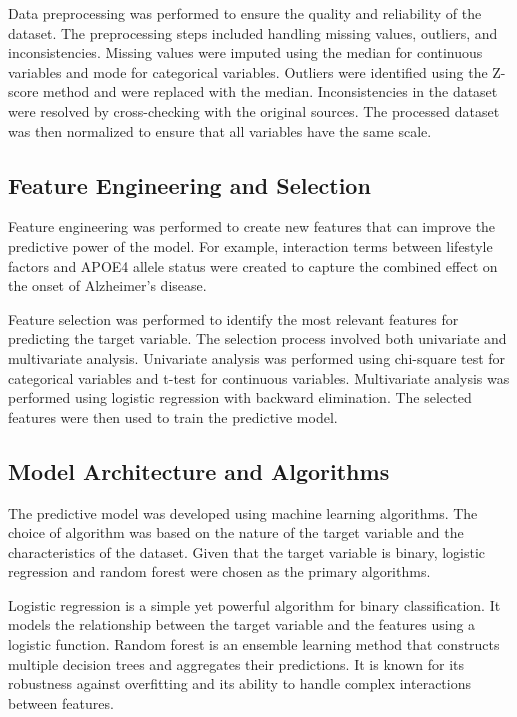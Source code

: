 \documentclass[conference]{IEEEtran}
\begin{document}
Data preprocessing was performed to ensure the quality and reliability of the dataset. The preprocessing steps included handling missing values, outliers, and inconsistencies. Missing values were imputed using the median for continuous variables and mode for categorical variables. Outliers were identified using the Z-score method and were replaced with the median. Inconsistencies in the dataset were resolved by cross-checking with the original sources. The processed dataset was then normalized to ensure that all variables have the same scale. 

\subsection{Feature Engineering and Selection}

Feature engineering was performed to create new features that can improve the predictive power of the model. For example, interaction terms between lifestyle factors and APOE4 allele status were created to capture the combined effect on the onset of Alzheimer's disease. 

Feature selection was performed to identify the most relevant features for predicting the target variable. The selection process involved both univariate and multivariate analysis. Univariate analysis was performed using chi-square test for categorical variables and t-test for continuous variables. Multivariate analysis was performed using logistic regression with backward elimination. The selected features were then used to train the predictive model.

\subsection{Model Architecture and Algorithms}

The predictive model was developed using machine learning algorithms. The choice of algorithm was based on the nature of the target variable and the characteristics of the dataset. Given that the target variable is binary, logistic regression and random forest were chosen as the primary algorithms. 

Logistic regression is a simple yet powerful algorithm for binary classification. It models the relationship between the target variable and the features using a logistic function. Random forest is an ensemble learning method that constructs multiple decision trees and aggregates their predictions. It is known for its robustness against overfitting and its ability to handle complex interactions between features.
\end{document}
